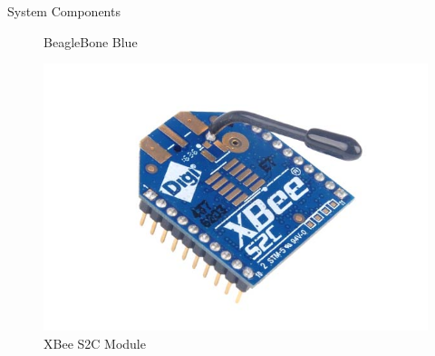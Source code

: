 \documentclass{beamer}
\begin{document}
\begin{frame}{System Components}
\begin{figure}
\begin{minipage}[t]{0.32\textwidth}
      \caption{BeagleBone Blue}
      \label{fig:beagleboneBlue}
    \end{minipage}
    \begin{minipage}[t]{0.32\textwidth}
      \includegraphics[width=1\textwidth]{figs/img/Xbee-S2C-Module}
      \caption{XBee S2C Module}
      \label{fig:XBeeModule}
    \end{minipage}
  \end{figure}
\end{frame}

\end{document}
